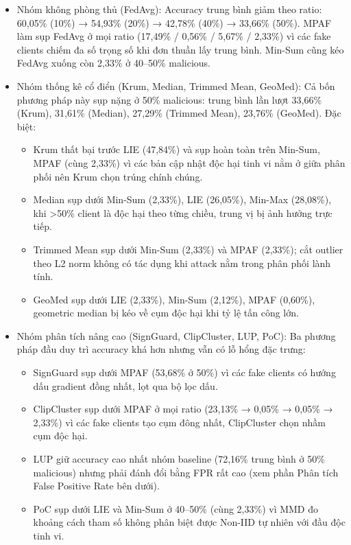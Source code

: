 \begin{itemize}
\item
  Nhóm không phòng thủ (FedAvg): Accuracy trung bình giảm theo ratio: 60,05\% (10\%) → 54,93\% (20\%) → 42,78\% (40\%) → 33,66\% (50\%). MPAF làm sụp FedAvg ở mọi ratio (17,49\% / 0,56\% / 5,67\% / 2,33\%) vì các fake clients chiếm đa số trọng số khi đơn thuần lấy trung bình. Min-Sum cũng kéo FedAvg xuống còn 2,33\% ở 40--50\% malicious.
\item
  Nhóm thống kê cổ điển (Krum, Median, Trimmed Mean, GeoMed): Cả bốn phương pháp này sụp nặng ở 50\% malicious: trung bình lần lượt 33,66\% (Krum), 31,61\% (Median), 27,29\% (Trimmed Mean), 23,76\% (GeoMed). Đặc biệt:

  \begin{itemize}
  \item
    Krum thất bại trước LIE (47,84\%) và sụp hoàn toàn trên Min-Sum, MPAF (cùng 2,33\%) vì các bản cập nhật độc hại tinh vi nằm ở giữa phân phối nên Krum chọn trúng chính chúng.
  \item
    Median sụp dưới Min-Sum (2,33\%), LIE (26,05\%), Min-Max (28,08\%), khi \textgreater50\% client là độc hại theo từng chiều, trung vị bị ảnh hưởng trực tiếp.
  \item
    Trimmed Mean sụp dưới Min-Sum (2,33\%) và MPAF (2,33\%); cắt outlier theo L2 norm không có tác dụng khi attack nằm trong phân phối lành tính.
  \item
    GeoMed sụp dưới LIE (2,33\%), Min-Sum (2,12\%), MPAF (0,60\%), geometric median bị kéo về cụm độc hại khi tỷ lệ tấn công lớn.
  \end{itemize}
\item
  Nhóm phân tích nâng cao (SignGuard, ClipCluster, LUP, PoC): Ba phương pháp đầu duy trì accuracy khá hơn nhưng vẫn có lỗ hổng đặc trưng:

  \begin{itemize}
  \item
    SignGuard sụp dưới MPAF (53,68\% ở 50\%) vì các fake clients có hướng dấu gradient đồng nhất, lọt qua bộ lọc dấu.
  \item
    ClipCluster sụp dưới MPAF ở mọi ratio (23,13\% → 0,05\% → 0,05\% → 2,33\%) vì các fake clients tạo cụm đông nhất, ClipCluster chọn nhầm cụm độc hại.
  \item
    LUP giữ accuracy cao nhất nhóm baseline (72,16\% trung bình ở 50\% malicious) nhưng phải đánh đổi bằng FPR rất cao (xem phần Phân tích False Positive Rate bên dưới).
  \item
    PoC sụp dưới LIE và Min-Sum ở 40--50\% (cùng 2,33\%) vì MMD đo khoảng cách tham số không phân biệt được Non-IID tự nhiên với đầu độc tinh vi.
  \end{itemize}
\end{itemize}

